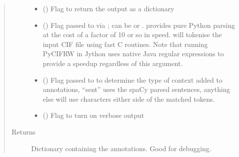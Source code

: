 \documentclass[letterpaper,10pt,english]{sphinxmanual}
\begin{document}
\begin{fulllineitems}
\begin{quote}
\begin{description}
\begin{itemize}
\item {} 
 (\sphinxstyleliteralemphasis{\sphinxupquote{, }}\sphinxstyleliteralemphasis{\sphinxupquote{, }}) \textendash{} Flag to return the output as a dictionary

\item {} 
 (\sphinxstyleliteralemphasis{\sphinxupquote{, }}\sphinxstyleliteralemphasis{\sphinxupquote{, }}) \textendash{} Flag passed to  via ;  can be  or .   provides
pure Python parsing at the cost of a factor of 10 or so in speed.   will tokenise
the input CIF file using fast C routines.  Note that running PyCIFRW in Jython uses
native Java regular expressions to provide a speedup regardless of this argument.

\item {} 
 (\sphinxstyleliteralemphasis{\sphinxupquote{, }}\sphinxstyleliteralemphasis{\sphinxupquote{, }}) \textendash{} Flag passed to  to determine the type of context added
to annotations, “sent” uses the spaCy parsed sentences, anything else will use 
characters either side of the matched tokens.

\item {} 
 (\sphinxstyleliteralemphasis{\sphinxupquote{, }}\sphinxstyleliteralemphasis{\sphinxupquote{, }}) \textendash{} Flag to turn on verbose output

\end{itemize}

\item[{Returns}] \leavevmode
{} \textendash{} Dictionary containing the annotations. Good for debugging.


\end{description}
\end{quote}
\end{fulllineitems}
\end{document}
